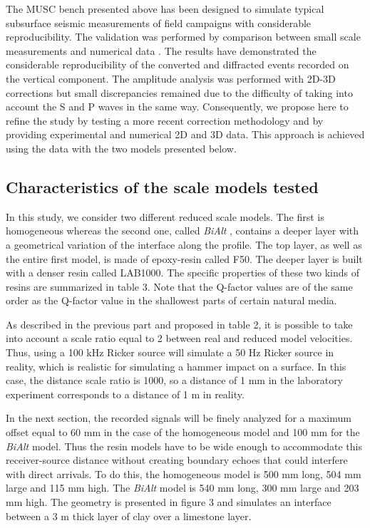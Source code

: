 \documentclass[manuscript,revised]{geophysics}
\newcommand{\bialt}{\textit{BiAlt} }
\begin{document}
\noindent The MUSC bench presented above has been designed to simulate typical subsurface seismic measurements of field campaigns with considerable reproducibility. The validation was performed by comparison between small scale measurements and numerical data \citep{Bretaudeau_SSM_2011}. The results have demonstrated the considerable reproducibility of the converted and diffracted events recorded on the vertical component. The amplitude analysis was performed with 2D-3D corrections but small discrepancies remained due to the difficulty of taking into account the S and P waves in the same way. Consequently, we propose here to refine the study by testing a more recent correction methodology \citet{Schafer_LSS_2014} and by providing experimental and numerical 2D and 3D data. This approach is achieved using the data with the two models presented below.


\subsection{Characteristics of the scale models tested}

\noindent In this study, we consider two different reduced scale models. The first is homogeneous whereas the second one, called \bialt, contains a deeper layer with a geometrical variation of the interface along the profile. The top layer, as well as the entire first model, is made of epoxy-resin called F50. The deeper layer is built with a denser resin called LAB1000. The specific properties of these two kinds of resins are summarized in table 3. Note that the Q-factor values are of the same order as the Q-factor value in the shallowest parts of certain natural media.

\noindent As described in the previous part and proposed in table 2, it is possible to take into account a scale ratio equal to 2 between real and reduced model velocities. Thus, using a 100 kHz Ricker source will simulate a 50 Hz Ricker source in reality, which is realistic for simulating a hammer impact on a surface. In this case, the distance scale ratio is 1000, so a distance of 1 mm in the laboratory experiment corresponds to a distance of 1 m in reality. 

\noindent In the next section, the recorded signals will be finely analyzed for a maximum offset equal to 60 mm in the case of the homogeneous model and 100 mm for the \bialt model. Thus the resin models have to be wide enough to accommodate this receiver-source distance without creating boundary echoes that could interfere with direct arrivals. To do this, the homogeneous model is 500 mm long, 504 mm large and 115 mm high. The \bialt model is 540 mm long, 300 mm large and 203 mm high. The geometry is presented in figure 3 and simulates an interface between a 3 m thick layer of clay over a limestone layer.
\end{document}
